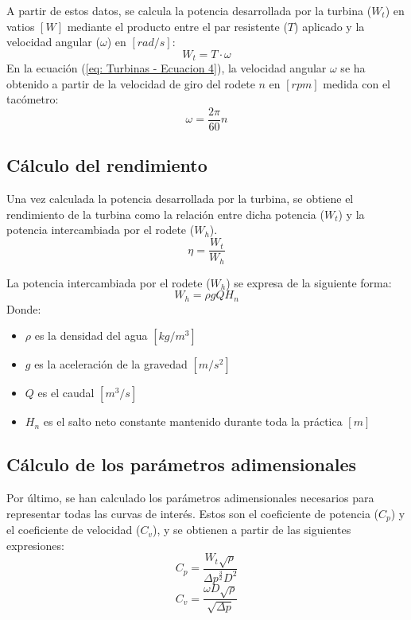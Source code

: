 \documentclass[10pt]{IEEEtran}
\begin{document}
A partir de estos datos, se calcula la potencia desarrollada por la turbina ($W_t$) en vatios $[W]$ mediante el producto entre el par resistente ($T$) aplicado y la velocidad angular ($\omega$) en $[rad/s]$:
\begin{equation}
  W_t = T \cdot \omega
  \label{eq: Turbinas - Ecuacion 4}
\end{equation}
En la ecuación (\ref{eq: Turbinas - Ecuacion 4}), la velocidad angular $\omega$ se ha obtenido a partir de la velocidad de giro del rodete $n$ en $[rpm]$ medida con el tacómetro:
\begin{equation}
  \omega = \frac{2 \pi}{60} n
\end{equation}

\subsection{Cálculo del rendimiento}
Una vez calculada la potencia desarrollada por la turbina, se obtiene el rendimiento de la turbina como la relación entre dicha potencia ($W_t$) y la potencia intercambiada por el rodete ($W_h$).
\begin{equation}
  \eta = \frac{W_t}{W_h}
  \label{eq: Turbinas - Ecuacion 6}
\end{equation}

La potencia intercambiada por el rodete ($W_h$) se expresa de la siguiente forma:
\begin{equation}
  W_h = \rho g Q H_n
\end{equation}
Donde:
\begin{itemize}
  \item $\rho$ es la densidad del agua $[kg/m^3]$
  \item $g$ es la aceleración de la gravedad $[m/s^2]$
  \item $Q$ es el caudal $[m^3/s]$
  \item $H_n$ es el salto neto constante mantenido durante toda la práctica $[m]$
\end{itemize}

\subsection{Cálculo de los parámetros adimensionales}
Por último, se han calculado los parámetros adimensionales necesarios para representar todas las curvas de interés. Estos son el coeficiente de potencia ($C_p$) y el coeficiente de velocidad ($C_v$), y se obtienen a partir de las siguientes expresiones:
\begin{equation}
  C_p = \frac{W_t \sqrt{\rho}}{\Delta p^{\frac{3}{2}}D^2}
  \label{eq: Turbinas - Ecuacion 8}
\end{equation}
\begin{equation}
  C_v = \frac{\omega D \sqrt{\rho}}{\sqrt{\Delta p}}
  \label{eq: Turbinas - Ecuacion 9}
\end{equation}
\end{document}
